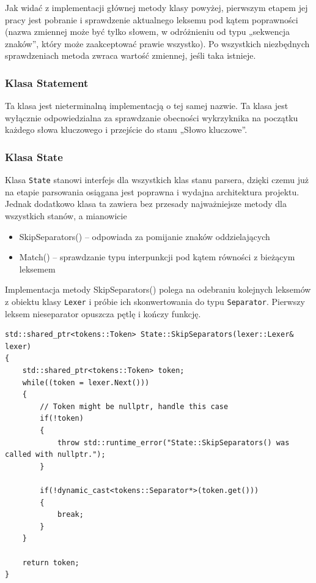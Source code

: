 Jak widać z implementacji głównej metody klasy powyżej, pierwszym etapem jej pracy jest pobranie i sprawdzenie aktualnego leksemu pod kątem poprawności (nazwa zmiennej może być tylko słowem, w odróżnieniu od typu „sekwencja znaków”, który może zaakceptować prawie wszystko). Po wszystkich niezbędnych sprawdzeniach metoda zwraca wartość zmiennej, jeśli taka istnieje.

\subsubsection{Klasa Statement}

Ta klasa jest nieterminalną implementacją o tej samej nazwie. Ta klasa jest wyłącznie odpowiedzialna za sprawdzanie obecności wykrzyknika na początku każdego słowa kluczowego i przejście do stanu „Słowo kluczowe”.

\subsubsection{Klasa State}

Klasa \texttt{State} stanowi interfejs dla wszystkich klas stanu parsera, dzięki czemu już na etapie parsowania osiągana jest poprawna i wydajna architektura projektu. Jednak dodatkowo klasa ta zawiera bez przesady najważniejsze metody dla wszystkich stanów, a mianowicie

\begin{itemize}
	\item SkipSeparators() -- odpowiada za pomijanie znaków oddzielających
	\item Match() -- sprawdzanie typu interpunkcji pod kątem równości z bieżącym leksemem
\end{itemize}

Implementacja metody SkipSeparators() polega na odebraniu kolejnych leksemów z obiektu klasy \texttt{Lexer} i próbie ich skonwertowania do typu \texttt{Separator}. Pierwszy leksem nieseparator opuszcza pętlę i kończy funkcję.

\begin{lstlisting}[label=list:separator_skip,caption=Metoda State::SkipSeparators(),basicstyle=\footnotesize\ttfamily]
std::shared_ptr<tokens::Token> State::SkipSeparators(lexer::Lexer& lexer)
{
    std::shared_ptr<tokens::Token> token;
    while((token = lexer.Next()))
    {
        // Token might be nullptr, handle this case
        if(!token)
        {
            throw std::runtime_error("State::SkipSeparators() was called with nullptr.");
        }
    
        if(!dynamic_cast<tokens::Separator*>(token.get()))
        {
            break;
        }
    }
    
    return token;
}
\end{lstlisting}

